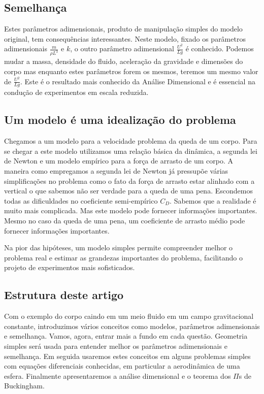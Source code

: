 \subsection{Semelhança}
Estes parâmetros adimensionais, produto de manipulação simples do modelo original, tem consequências interessantes. Neste modelo, fixado os parâmetros adimensionais $\frac{m}{\rho L^3}$ e $k$, o outro parâmetro adimensional $\frac{U^2}{Lg}$ é conhecido. Podemos mudar a massa, densidade do fluido, aceleração da gravidade e dimensões do corpo mas enquanto estes parâmetros forem os mesmos, teremos um mesmo valor de $\frac{U^2}{Lg}$. Este é o resultado mais conhecido da Análise Dimensional e é essencial na condução de experimentos em escala reduzida.

\subsection{Um modelo é uma idealização do problema}
Chegamos a um modelo para a velocidade  problema da queda de um corpo. Para se chegar a este modelo utilizamos uma relação básica da dinâmica, a segunda lei de Newton e um modelo empírico para a força de arrasto de um corpo. A maneira como empregamos a segunda lei de Newton já pressupõe várias simplificações no problema como o fato da força de arrasto estar alinhado com a vertical o que sabemos não ser verdade para a queda de uma pena. Escondemos todas as dificuldades no coeficiente semi-empírico $C_D$. Sabemos que a realidade é muito mais complicada. Mas este modelo pode fornecer informações importantes. Mesmo no caso da queda de uma pena, um coeficiente de arrasto médio pode fornecer informações importantes.

Na pior das hipóteses, um modelo simples permite compreender melhor o problema real e estimar as grandezas importantes do problema, facilitando o projeto de experimentos mais sofisticados.

\subsection{Estrutura deste artigo}

Com o exemplo do corpo caindo em um meio fluido em um campo gravitacional constante, introduzimos vários conceitos como modelos, parâmetros adimensionais e semelhança. Vamos, agora, entrar mais a fundo em cada questão. Geometria simples será usada para entender melhor os parâmetros adimensionais e semelhança. Em seguida usaremos estes conceitos em alguns problemas simples com equações diferenciais conhecidas, em particular a aerodinâmica de uma esfera. Finalmente apresentaremos a análise dimensional e o teorema dos $\Pi$s de Buckingham.

